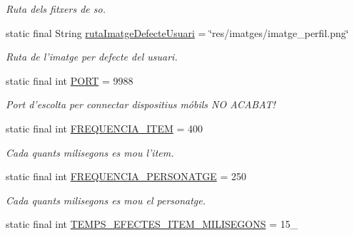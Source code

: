 \begin{DoxyCompactItemize}
\begin{DoxyCompactList}\small\item\em Ruta dels fitxers de so. \end{DoxyCompactList}\item 
\hypertarget{classlogica_1_1_utils_1_1_constants_ade48d3523c996d6ddcc9b01e7443f314}{static final String \hyperlink{classlogica_1_1_utils_1_1_constants_ade48d3523c996d6ddcc9b01e7443f314}{ruta\+Imatge\+Defecte\+Usuari} = \char`\"{}res/imatges/imatge\+\_\+perfil.\+png\char`\"{}}\label{classlogica_1_1_utils_1_1_constants_ade48d3523c996d6ddcc9b01e7443f314}

\begin{DoxyCompactList}\small\item\em Ruta de l'imatge per defecte del usuari. \end{DoxyCompactList}\item 
\hypertarget{classlogica_1_1_utils_1_1_constants_a4d90a65d9ab5934effaaa3c64a554570}{static final int \hyperlink{classlogica_1_1_utils_1_1_constants_a4d90a65d9ab5934effaaa3c64a554570}{P\+O\+R\+T} = 9988}\label{classlogica_1_1_utils_1_1_constants_a4d90a65d9ab5934effaaa3c64a554570}

\begin{DoxyCompactList}\small\item\em Port d'escolta per connectar dispositius móbils N\+O A\+C\+A\+B\+A\+T! \end{DoxyCompactList}\item 
\hypertarget{classlogica_1_1_utils_1_1_constants_ad2b8757e8f32d324463b06fdc5795f39}{static final int \hyperlink{classlogica_1_1_utils_1_1_constants_ad2b8757e8f32d324463b06fdc5795f39}{F\+R\+E\+Q\+U\+E\+N\+C\+I\+A\+\_\+\+I\+T\+E\+M} = 400}\label{classlogica_1_1_utils_1_1_constants_ad2b8757e8f32d324463b06fdc5795f39}

\begin{DoxyCompactList}\small\item\em Cada quants milisegons es mou l'item. \end{DoxyCompactList}\item 
\hypertarget{classlogica_1_1_utils_1_1_constants_ab1b0f9897e96ea902dcd99db6fc47cc2}{static final int \hyperlink{classlogica_1_1_utils_1_1_constants_ab1b0f9897e96ea902dcd99db6fc47cc2}{F\+R\+E\+Q\+U\+E\+N\+C\+I\+A\+\_\+\+P\+E\+R\+S\+O\+N\+A\+T\+G\+E} = 250}\label{classlogica_1_1_utils_1_1_constants_ab1b0f9897e96ea902dcd99db6fc47cc2}

\begin{DoxyCompactList}\small\item\em Cada quants milisegons es mou el personatge. \end{DoxyCompactList}\item 
\hypertarget{classlogica_1_1_utils_1_1_constants_ab30ed70143525f71ad7d7d6e21cff608}{static final int \hyperlink{classlogica_1_1_utils_1_1_constants_ab30ed70143525f71ad7d7d6e21cff608}{T\+E\+M\+P\+S\+\_\+\+E\+F\+E\+C\+T\+E\+S\+\_\+\+I\+T\+E\+M\+\_\+\+M\+I\+L\+I\+S\+E\+G\+O\+N\+S} = 15\+\_}\label{classlogica_1_1_utils_1_1_constants_ab30ed70143525f71ad7d7d6e21cff608}


\end{DoxyCompactItemize}
